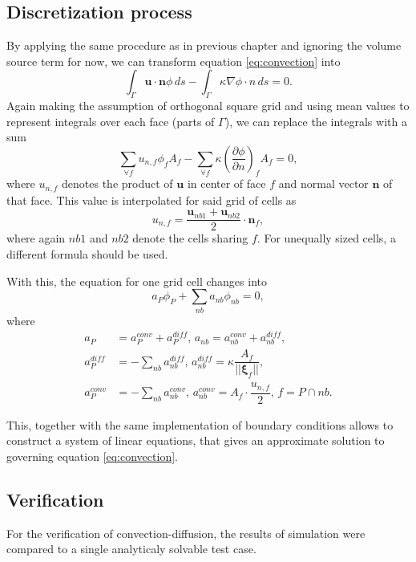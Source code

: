 \documentclass[]{article}
\begin{document}
\subsection{Discretization process} \label{subsec:conv_disc}
By applying the same procedure as in previous chapter and ignoring the volume source term for now, we can transform equation \ref{eq:convection} into
\begin{equation}\label{key}
\int_{\Gamma} \mathbf{u\cdot n}\phi \, ds - \int_\Gamma \kappa \nabla \phi \cdot n \, ds = 0.
\end{equation}
Again making the assumption of orthogonal square grid and using mean values to represent integrals over each face (parts of $ \Gamma $), we can replace the integrals with a sum
\begin{equation}
\sum_{\forall f} u_{n,f}\phi_f A_f - \sum_{\forall f} \kappa  \left(\frac{\partial\phi}{\partial n}\right)_f A_f = 0,
\end{equation} 
where $ u_{n,f} $ denotes the product of $ \mathbf{u} $ in center of face $ f $ and normal vector $ \mathbf{n} $ of that face. This value is interpolated for said grid of cells as 
\begin{equation}
u_{n,f} = \dfrac{\mathbf{u}_{nb1}+\mathbf{u}_{nb2}}{2}\cdot \mathbf{n}_f,
\end{equation}
where again $ nb1 $ and $ nb2 $ denote the cells sharing $ f $. For unequally sized cells, a different formula should be used. 

With this, the equation for one grid cell changes into
\begin{equation}\label{eq:convection_one_cell}
a_P\phi_P + \sum_{nb} a_{nb} \phi_{nb} =0,
\end{equation}
where
\begin{align}
a_P &= a_P^{conv} + a_P^{diff},\,
a_{nb} = a_{nb}^{conv} + a_{nb}^{diff},\\
a_P^{diff} &= - \sum_{nb} a_{nb}^{diff},\,
a_{nb}^{diff} = \kappa \dfrac{A_f}{||\boldsymbol{\xi}_f||},\\
a_P^{conv} &=  - \sum_{nb} a_{nb}^{conv},\,
a_{nb}^{conv} = A_f \cdot \dfrac{u_{n,f}}{2}, \, f = P \cap nb.
\end{align}

This, together with the same implementation of boundary conditions allows to construct a system of linear equations, that gives an approximate solution to governing equation \ref{eq:convection}.

\subsection{Verification}
For the verification of convection-diffusion, the results of simulation were compared to a single analyticaly solvable test case.
\end{document}
